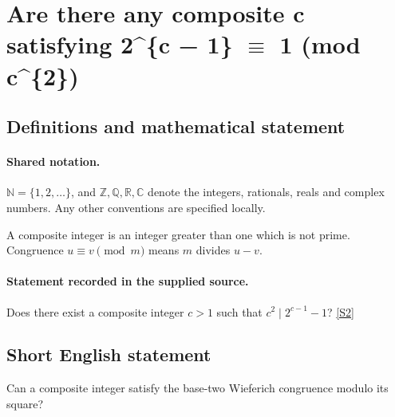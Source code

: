 \documentclass[11pt]{article}
\newcommand{\sref}[2]{\hyperlink{source:#1:#2}{[S#2]}}
\begin{document}
\section{\texorpdfstring{Are there any composite c satisfying 2\textasciicircum{}\{c − 1\} $\equiv$ 1 (mod c\textasciicircum{}\{2\})}{Are there any composite c satisfying 2\textasciicircum{}\{c − 1\} congruent to 1 (mod c\textasciicircum{}\{2\})}}\label{statement}

\subsection{Definitions and mathematical statement}

\paragraph{Shared notation.}$\mathbb N=\{1,2,\ldots\}$, and $\mathbb Z,\mathbb Q,\mathbb R,\mathbb C$ denote the integers, rationals, reals and complex numbers. Any other conventions are specified locally.


A composite integer is an integer greater than one which is not prime. Congruence $u\equiv v\pmod m$ means $m$ divides $u-v$.
\paragraph{Statement recorded in the supplied source.}
Does there exist a composite integer $c>1$ such that $c^2\mid2^{c-1}-1$? \sref{statement}{2}
\subsection{Short English statement}
Can a composite integer satisfy the base-two Wieferich congruence modulo its square?
\end{document}
